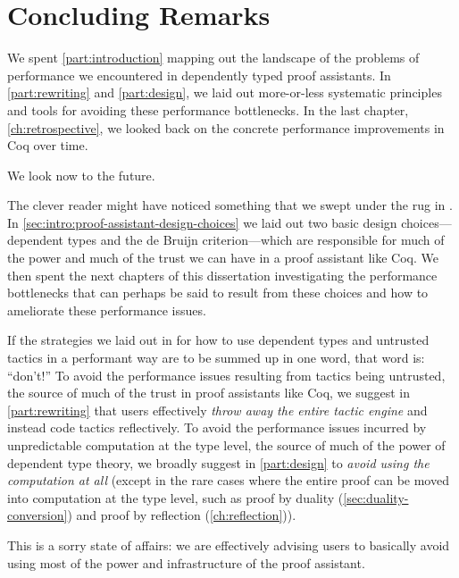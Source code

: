 \chapter{Concluding Remarks}\label{ch:conclusion}

We spent \autoref{part:introduction} mapping out the landscape of the problems of performance we encountered in dependently typed proof assistants.
In \autoref{part:rewriting} and \autoref{part:design}, we laid out more-or-less systematic principles and tools for avoiding these performance bottlenecks.
In the last chapter, \autoref{ch:retrospective}, we looked back on the concrete performance improvements in Coq over time.

We look now to the future.

The clever reader might have noticed something that we swept under the rug in .
In \autoref{sec:intro:proof-assistant-design-choices} we laid out two basic design choices---dependent types and the de Bruijn criterion---which are responsible for much of the power and much of the trust we can have in a proof assistant like Coq.
We then spent the next chapters of this dissertation investigating the performance bottlenecks that can perhaps be said to result from these choices and how to ameliorate these performance issues.

If the strategies we laid out in  for how to use dependent types and untrusted tactics in a performant way are to be summed up in one word, that word is: ``don't!''
To avoid the performance issues resulting from tactics being untrusted, the source of much of the trust in proof assistants like Coq, we suggest in \autoref{part:rewriting} that users effectively \emph{throw away the entire tactic engine} and instead code tactics reflectively.
To avoid the performance issues incurred by unpredictable computation at the type level, the source of much of the power of dependent type theory, we broadly suggest in \autoref{part:design} to \emph{avoid using the computation at all} (except in the rare cases where the entire proof can be moved into computation at the type level, such as proof by duality (\autoref{sec:duality-conversion}) and proof by reflection (\autoref{ch:reflection})).

This is a sorry state of affairs:
we are effectively advising users to basically avoid using most of the power and infrastructure of the proof assistant.

